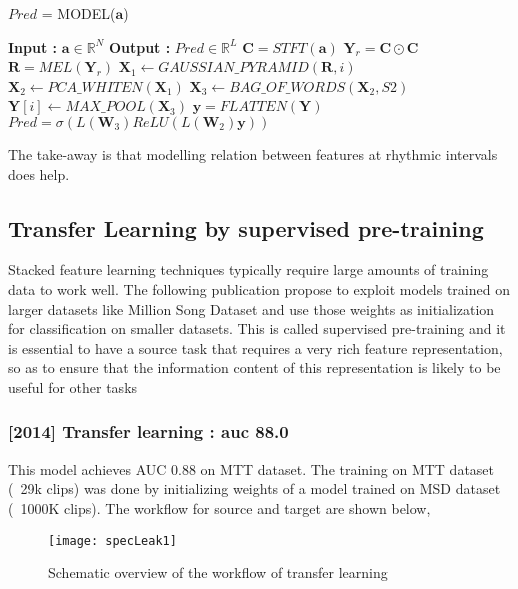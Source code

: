 \begin{algorithm}
  \caption{$Pred$ = MODEL($\textbf{a}$) }\label{Temporal Pooling}
  \begin{algorithmic}[1]
    \Statex \textbf{Input :} $\textbf{a} \in \mathbb{R}^{N}$
    \Statex \textbf{Output :} $Pred \in \mathbb{R}^{L}$ 
    \State $\textbf{C} = STFT(\textbf{a})$ 
    \State $\textbf{Y}_{r} = \textbf{C} \odot \textbf{C}$ 
    \State $\textbf{R} = MEL(\textbf{Y}_{r})$ 
     \State $\textbf{X}_{1} \leftarrow GAUSSIAN\_PYRAMID(\textbf{R},i)$ 
    \State $\textbf{X}_{2} \leftarrow PCA\_WHITEN(\textbf{X}_{1})$ 
     \State $\textbf{X}_{3} \leftarrow BAG\_OF\_WORDS(\textbf{X}_{2},S2)$ 
    \State $\textbf{Y}[i] \leftarrow MAX\_POOL(\textbf{X}_{3})$ 
    \EndFor
    \State $\textbf{y} = FLATTEN(\textbf{Y})$ 
    \State $Pred = \sigma(L(\textbf{W}_{3})ReLU(L(\textbf{W}_{2})\textbf{y}))$ 
  \end{algorithmic}
\end{algorithm}
\noindent The take-away is that modelling relation between features at rhythmic intervals does help.

\subsection{Transfer Learning by supervised pre-training}
\label{transfer}
Stacked feature learning techniques  typically require large amounts of training data to work well. The following publication propose to exploit models trained on larger datasets like Million Song Dataset and use those weights as initialization for classification on smaller datasets. This is called supervised pre-training and it is essential to have a source task that requires a very rich feature representation, so as to ensure that the information content of this representation is likely to be useful for other tasks

\subsubsection{[2014] Transfer learning : auc 88.0}
This model achieves AUC 0.88 on MTT dataset. The training on MTT dataset (~29k clips) was done by initializing weights of a model trained on MSD dataset (~1000K clips). The workflow for source and target are shown below,
\begin{figure}[h] 
\centering
\texttt{[image: specLeak1]}
\caption{Schematic overview of the workflow of transfer learning}
 \label{fig:transfer learning}
 \end{figure}
\FloatBarrier
\bigskip

